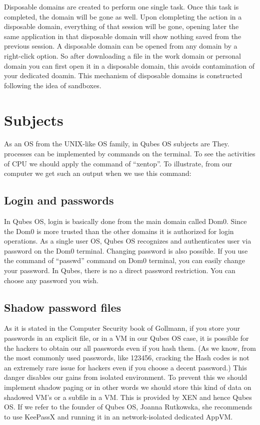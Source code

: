 \documentclass[runningheads,a4paper]{article}
\begin{document}
Disposable domains are created to perform one single task. Once this task is completed, the domain will be gone as well. Upon clompleting the action in a disposable domain, everything of that session will be gone, opening later the same application in that disposable domain will show nothing saved from the previous session. A disposable domain can be opened from any domain by a right-click option. So after downloading a file in the work domain or personal domain you can first open it in a disposable domain, this avoids contamination of your dedicated doamin. 
This mechanism of disposable domains is constructed following the idea of sandboxes.


\section{Subjects}

As an OS from the UNIX-like OS family, in Qubes OS
subjects are They. processes can be implemented by commands on the
terminal. To see the activities of CPU we should apply the command of
“xentop”. To illustrate, from our computer we get such an output when
we use this command:

\subsection{Login and passwords} 

In Qubes OS, login is basically done
from the main domain called Dom0.  Since the Dom0 is more trusted than
the other domains it is authorized for login operations.  As a single
user OS, Qubes OS recognizes and authenticates user via password on
the Dom0 terminal.  Changing password is also possible.  If you use
the command of “passwd” command on Dom0 terminal, you can easily
change your password.  In Qubes, there is no a direct password
restriction.  You can choose any password you wish.

\subsection{Shadow password files} 

As it is stated in the Computer
Security book of Gollmann, if you store your passwords in an explicit
file, or in a VM in our Qubes OS case, it is possible for the hackers
to obtain our all passwords even if you hash them.  (As we know, from
the most commonly used passwords, like 123456, cracking the Hash codes
is not an extremely rare issue for hackers even if you choose a decent
password.)  This danger disables our gains from isolated environment.
To prevent this we should implement shadow paging or in other words we
should store this kind of data on shadowed VM’s or a subfile in a VM.
This is provided by XEN and hence Qubes OS.  If we refer to the
founder of Qubes OS, Joanna Rutkowska, she recommends to use KeePassX
and running it in an network-isolated dedicated AppVM.
\end{document}
